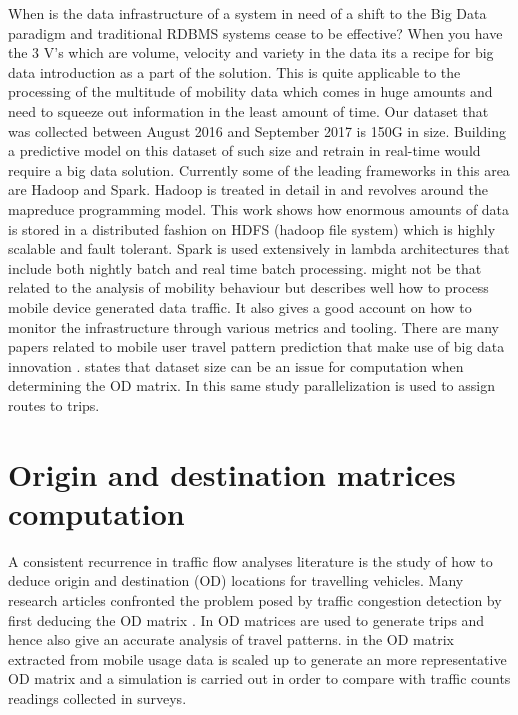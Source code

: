 \documentclass[12pt, a4paper]{report}
\theoremstyle{definition}
\theoremstyle{definition}%
\theoremstyle{definition}%
\theoremstyle{definition}%
\theoremstyle{definition}%
\theoremstyle{definition}%
\begin{document}
When is the data infrastructure of a system in need of a shift to the Big Data paradigm and traditional RDBMS systems cease to be effective? When you have the 3 V's which are volume, velocity and variety in the data its a recipe for big data introduction as a part of the solution. This is quite applicable to the processing of the multitude of mobility data which comes in huge amounts and need to squeeze out information in the least amount of time. Our dataset that was collected between August 2016 and September 2017 is 150G in size. Building a predictive model on this dataset of such size and retrain in real-time would require a big data solution. Currently some of the leading frameworks in this area are Hadoop and Spark. Hadoop is treated in detail in \cite{Liu2014} and revolves around the mapreduce programming model. This work shows how enormous amounts of data is stored in a distributed fashion on HDFS (hadoop file system) which is highly scalable and fault tolerant. Spark is used extensively in lambda architectures that include both nightly batch and real time batch processing. \cite{Liu2014} might not be that related to the analysis of mobility behaviour but describes well how to process mobile device generated data traffic. It also gives a good account on how to monitor the infrastructure through various metrics and tooling. There are many papers related to mobile user travel pattern prediction that make use of big data innovation  \cite{Liu2014,Laurila2012,Kurien2012}. \cite{Toole2015} states that dataset size can be an issue for computation when determining the OD matrix. In this same study parallelization is used to assign routes to trips.


\section{Origin and destination matrices computation} \label{section:OD_Matrices}
A consistent recurrence in traffic flow analyses literature is the study of how to deduce origin and destination (OD) locations for travelling vehicles\cite{Iqbal2014}. Many research articles confronted the problem posed by traffic congestion detection by first deducing the OD matrix \cite{Toole2015,Iqbal2014,Alexander2015,Calabrese2011,Calabrese2013,Colak2015}. In \cite{Alexander2015} OD matrices are used to generate trips and hence also give an accurate analysis of travel patterns. in \cite{Iqbal2014} the OD matrix extracted from mobile usage data is scaled up to generate an more representative OD matrix and a simulation is carried out in order to compare with traffic counts readings collected in surveys.
\end{document}
